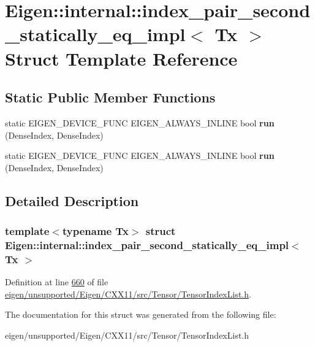 \hypertarget{struct_eigen_1_1internal_1_1index__pair__second__statically__eq__impl}{}\section{Eigen\+:\+:internal\+:\+:index\+\_\+pair\+\_\+second\+\_\+statically\+\_\+eq\+\_\+impl$<$ Tx $>$ Struct Template Reference}
\label{struct_eigen_1_1internal_1_1index__pair__second__statically__eq__impl}
\subsection*{Static Public Member Functions}
\begin{DoxyCompactItemize}
\item 
\mbox{\label{struct_eigen_1_1internal_1_1index__pair__second__statically__eq__impl_a76da6530ea4ad86eab4e0eadd809fa67}} 
static E\+I\+G\+E\+N\+\_\+\+D\+E\+V\+I\+C\+E\+\_\+\+F\+U\+NC E\+I\+G\+E\+N\+\_\+\+A\+L\+W\+A\+Y\+S\+\_\+\+I\+N\+L\+I\+NE bool {\bfseries run} (Dense\+Index, Dense\+Index)
\item 
\mbox{\label{struct_eigen_1_1internal_1_1index__pair__second__statically__eq__impl_a76da6530ea4ad86eab4e0eadd809fa67}} 
static E\+I\+G\+E\+N\+\_\+\+D\+E\+V\+I\+C\+E\+\_\+\+F\+U\+NC E\+I\+G\+E\+N\+\_\+\+A\+L\+W\+A\+Y\+S\+\_\+\+I\+N\+L\+I\+NE bool {\bfseries run} (Dense\+Index, Dense\+Index)
\end{DoxyCompactItemize}


\subsection{Detailed Description}
\subsubsection*{template$<$typename Tx$>$\newline
struct Eigen\+::internal\+::index\+\_\+pair\+\_\+second\+\_\+statically\+\_\+eq\+\_\+impl$<$ Tx $>$}



Definition at line \hyperlink{eigen_2unsupported_2_eigen_2_c_x_x11_2src_2_tensor_2_tensor_index_list_8h_source_l00660}{660} of file \hyperlink{eigen_2unsupported_2_eigen_2_c_x_x11_2src_2_tensor_2_tensor_index_list_8h_source}{eigen/unsupported/\+Eigen/\+C\+X\+X11/src/\+Tensor/\+Tensor\+Index\+List.\+h}.



The documentation for this struct was generated from the following file\+:\begin{DoxyCompactItemize}
\item 
eigen/unsupported/\+Eigen/\+C\+X\+X11/src/\+Tensor/\+Tensor\+Index\+List.\+h\end{DoxyCompactItemize}

